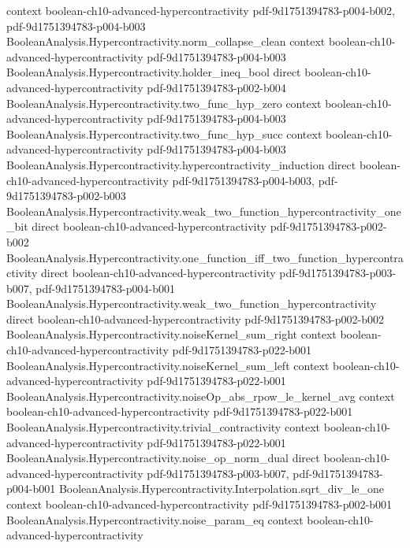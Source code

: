 \begin{theorem}
  {context}
  {boolean-ch10-advanced-hypercontractivity}
  {pdf-9d1751394783-p004-b002,
    pdf-9d1751394783-p004-b003}
\proofstep
  {BooleanAnalysis.Hypercontractivity.norm_collapse_clean}
  {context}
  {boolean-ch10-advanced-hypercontractivity}
  {pdf-9d1751394783-p004-b003}
\proofstep
  {BooleanAnalysis.Hypercontractivity.holder_ineq_bool}
  {direct}
  {boolean-ch10-advanced-hypercontractivity}
  {pdf-9d1751394783-p002-b004}
\proofstep
  {BooleanAnalysis.Hypercontractivity.two_func_hyp_zero}
  {context}
  {boolean-ch10-advanced-hypercontractivity}
  {pdf-9d1751394783-p004-b003}
\proofstep
  {BooleanAnalysis.Hypercontractivity.two_func_hyp_succ}
  {context}
  {boolean-ch10-advanced-hypercontractivity}
  {pdf-9d1751394783-p004-b003}
\proofstep
  {BooleanAnalysis.Hypercontractivity.hypercontractivity_induction}
  {direct}
  {boolean-ch10-advanced-hypercontractivity}
  {pdf-9d1751394783-p004-b003,
    pdf-9d1751394783-p002-b003}
\proofstep
  {BooleanAnalysis.Hypercontractivity.weak_two_function_hypercontractivity_one_bit}
  {direct}
  {boolean-ch10-advanced-hypercontractivity}
  {pdf-9d1751394783-p002-b002}
\proofstep
  {BooleanAnalysis.Hypercontractivity.one_function_iff_two_function_hypercontractivity}
  {direct}
  {boolean-ch10-advanced-hypercontractivity}
  {pdf-9d1751394783-p003-b007,
    pdf-9d1751394783-p004-b001}
\proofstep
  {BooleanAnalysis.Hypercontractivity.weak_two_function_hypercontractivity}
  {direct}
  {boolean-ch10-advanced-hypercontractivity}
  {pdf-9d1751394783-p002-b002}
\proofstep
  {BooleanAnalysis.Hypercontractivity.noiseKernel_sum_right}
  {context}
  {boolean-ch10-advanced-hypercontractivity}
  {pdf-9d1751394783-p022-b001}
\proofstep
  {BooleanAnalysis.Hypercontractivity.noiseKernel_sum_left}
  {context}
  {boolean-ch10-advanced-hypercontractivity}
  {pdf-9d1751394783-p022-b001}
\proofstep
  {BooleanAnalysis.Hypercontractivity.noiseOp_abs_rpow_le_kernel_avg}
  {context}
  {boolean-ch10-advanced-hypercontractivity}
  {pdf-9d1751394783-p022-b001}
\proofstep
  {BooleanAnalysis.Hypercontractivity.trivial_contractivity}
  {context}
  {boolean-ch10-advanced-hypercontractivity}
  {pdf-9d1751394783-p022-b001}
\proofstep
  {BooleanAnalysis.Hypercontractivity.noise_op_norm_dual}
  {direct}
  {boolean-ch10-advanced-hypercontractivity}
  {pdf-9d1751394783-p003-b007,
    pdf-9d1751394783-p004-b001}
\proofstep
  {BooleanAnalysis.Hypercontractivity.Interpolation.sqrt_div_le_one}
  {context}
  {boolean-ch10-advanced-hypercontractivity}
  {pdf-9d1751394783-p002-b001}
\proofstep
  {BooleanAnalysis.Hypercontractivity.noise_param_eq}
  {context}
  {boolean-ch10-advanced-hypercontractivity}

\end{theorem}
